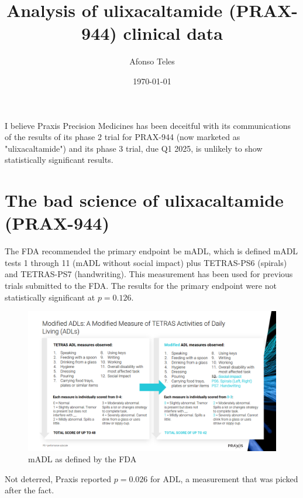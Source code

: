 \documentclass{article}
\title{Analysis of ulixacaltamide (PRAX-944) clinical data}
\date{\today}
\author{Afonso Teles}
\begin{document}
        \maketitle


        I believe Praxis Precision Medicines has been deceitful with its communications of the results of its phase 2 trial for PRAX-944 (now marketed as "ulixacaltamide") and its phase 3 trial, due Q1 2025, is unlikely to show statistically significant results.

        \section{The bad science of ulixacaltamide (PRAX-944)}
                The FDA recommended the primary endpoint be mADL, which is defined mADL tests 1 through 11 (mADL without social impact) plus TETRAS-PS6 (spirals) and TETRAS-PS7 (handwriting). This measurement has been used for previous trials submitted to the FDA. The results for the primary endpoint were not statistically significant at $p=0.126$.

        \begin{figure}[h]
                \centering
                \includegraphics[scale=0.3]{"Screenshot 2024-12-05 at 10-14-08 PowerPoint Presentation - Essential1 Topline Slides (IR Site).pdf.png"}
                \caption{mADL as defined by the FDA}
        \end{figure}

                Not deterred, Praxis reported $p=0.026$ for ADL, a measurement that was picked after the fact.
\end{document}
